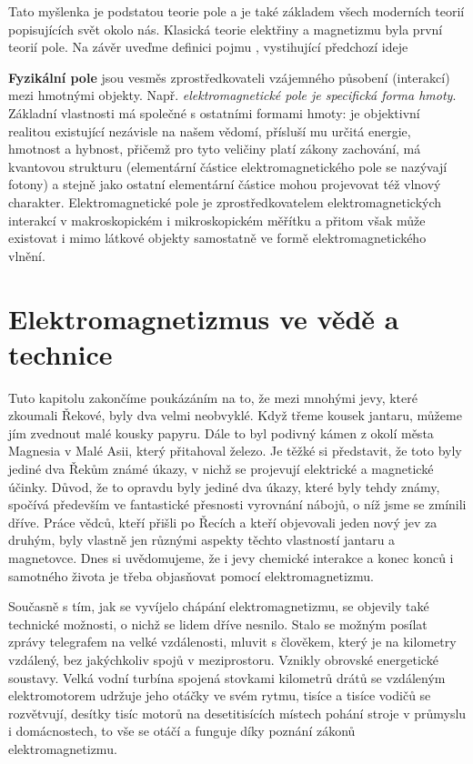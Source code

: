     Tato myšlenka je podstatou teorie pole a je také základem všech moderních teorií popisujících 
    svět okolo nás. Klasická teorie elektřiny a magnetizmu byla první teorií pole. Na závěr uveďme 
    definici pojmu , vystihující předchozí ideje
    \begin{definition}
      \textbf{Fyzikální pole} jsou vesměs zprostředkovateli vzájemného působení (interakcí) mezi 
      hmotnými objekty. Např. \emph{elektromagnetické pole je specifická forma hmoty}. Základní 
      vlastnosti má společné s ostatními formami hmoty: je objektivní realitou existující nezávisle 
      na našem vědomí, přísluší mu určitá energie, hmotnost a hybnost, přičemž pro tyto veličiny 
      platí zákony zachování, má kvantovou strukturu (elementární částice elektromagnetického pole 
      se nazývají fotony) a stejně jako ostatní elementární částice mohou projevovat též vlnový 
      charakter. Elektromagnetické pole je zprostředkovatelem elektromagnetických interakcí v 
      makroskopickém i mikroskopickém měřítku a přitom však může existovat i mimo látkové objekty 
      samostatně ve formě elektromagnetického vlnění.
    \end{definition}                 

  \section{Elektromagnetizmus ve vědě a technice}  
    \cite[s.~25]{Feynman02} Tuto kapitolu zakončíme poukázáním na to, že mezi mnohými jevy, které 
    zkoumali Řekové, byly dva velmi neobvyklé. Když třeme kousek jantaru, můžeme jím zvednout malé 
    kousky papyru. Dále to byl podivný kámen z okolí města Magnesia v Malé Asii, který přitahoval 
    železo. Je těžké si představit, že toto byly jediné dva Řekům známé úkazy, v nichž se projevují 
    elektrické a magnetické účinky. Důvod, že  to opravdu byly jediné dva úkazy, které byly tehdy 
    známy, spočívá především ve fantastické přesnosti vyrovnání nábojů, o níž jsme se zmínili 
    dříve. Práce vědců, kteří přišli po Řecích a kteří objevovali jeden nový jev za druhým, byly 
    vlastně jen různými aspekty těchto vlastností jantaru a magnetovce. Dnes si uvědomujeme, že i 
    jevy chemické interakce a konec konců i samotného života je třeba objasňovat pomocí 
    elektromagnetizmu.

    Současně s tím, jak se vyvíjelo chápání elektromagnetizmu, se objevily také technické možnosti, 
    o nichž se lidem dříve nesnilo. Stalo se možným posílat zprávy telegrafem na velké vzdálenosti, 
    mluvit s člověkem, který je na kilometry vzdálený, bez jakýchkoliv spojů v meziprostoru. 
    Vznikly obrovské energetické soustavy. Velká vodní turbína spojená stovkami kilometrů drátů se 
    vzdáleným elektromotorem udržuje jeho otáčky ve svém rytmu, tisíce a tisíce vodičů se 
    rozvětvují, desítky tisíc motorů na desetitisících místech pohání stroje v průmyslu i 
    domácnostech, to vše se otáčí a funguje díky poznání zákonů elektromagnetizmu.

